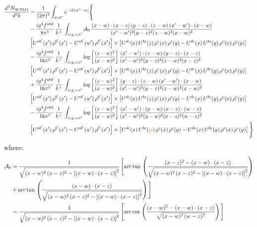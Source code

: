 \documentclass[9pt]{article}
\numberwithin{equation}{section}
\begin{document}
\begin{align}
\frac{d^{3}N_{3b\,\rm NLO}}{d^{3}k} & = \frac{1}{(2\pi)^{3}}\int_{w,w'}e^{-ik(w'-w)}\Bigg\{\notag \\
&-\frac{ig^{4}f^{abd}}{8\pi^{5}}\,\frac{1}{k^{+}}\,\int_{x,y,z,x'}\mathcal{A}_{0}\,
\frac{(x-w)\cdot(x-z)\,(y-z)\cdot(z-w)\,(x'-w')\cdot(x-w)}{(x'-w')^{2}(y-z)^{2}(z-w)^{2}(x-w)^{2}}\notag \\ & \left[U^{ab'}(x')\,\rho^{b'}(x')-U^{ab'}(w')\, \rho^{b'}(x')\right]\times \left[U^{de}(x)\,U^{bc}(z)\, \rho^{e}(x)\,\rho^{c}(y)-U^{de}(x)\,U^{bc}(y)\,\rho^{e}(x)\,\rho^{c}(y)\right] \notag \\
& -\frac{ig^{4}f^{abd}}{16\pi^{5}}\,\frac{1}{k^{+}}\,\int_{x,y,z,x'}\log{\left[\frac{(z-w)^{2}}{(x-w)^{2}}\right]}\,
\frac{(x'-w')\cdot(z-w)\,(y-z)\cdot(x-z)}{(x'-w')^{2}(y-z)^{2}(z-w)^{2}(x-z)^{2}}\notag \\
&\left[U^{ab'}(x')\,\rho^{b'}(x')-U^{ab'}(w')\, \rho^{b'}(x')\right]\times \left[U^{de}(x)\,U^{bc}(z)\, \rho^{e}(x)\,\rho^{c}(y)-U^{de}(x)\,U^{bc}(y)\,\rho^{e}(x)\,\rho^{c}(y)\right] \notag \\
&+ \frac{ig^{4}f^{abd}}{16\pi^{5}}\,\frac{1}{k^{+}}\,\int_{x,y,z,x'}\log{\left[\frac{(z-w)^{2}}{(x-w)^{2}}\right]}\,
\frac{(y-z)\cdot(z-w)\,(x'-w')\cdot(x-w)}{(x'-w')^{2}(y-z)^{2}(z-w)^{2}(x-w)^{2}}\notag \\ 
& \left[U^{ab'}(x')\,\rho^{b'}(x')-U^{ab'}(w')\, \rho^{b'}(x')\right]\times \left[U^{de}(x)\,U^{bc}(z)\, \rho^{e}(x)\,\rho^{c}(y)-U^{de}(x)\,U^{bc}(y)\,\rho^{e}(x)\,\rho^{c}(y)\right]\notag \\ & -\frac{ig^{4}f^{abd}}{16\pi^{5}}\,\frac{1}{k^{+}}\,\int_{x,y,z,x'}\log{\left[\frac{(z-w)^{2}}{(x-w)^{2}}\right]}\,\frac{(x'-w')\cdot(y-w)\, (x-z)\cdot (w-z)}{(x'-w')^{2}(y-w)^{2}(x-z)^{2}(w-z)^{2}}\notag \\ & \left[U^{ab'}(x')\,\rho^{b'}(x')-U^{ab'}(w')\, \rho^{b'}(x')\right]\times \left[U^{de}(x)\,U^{bc}(\textcolor{orange}{w})\, \rho^{e}(x)\,\rho^{c}(y)-U^{de}(x)\,U^{bc}(y)\,\rho^{e}(x)\,\rho^{c}(y)\right]\Bigg\}
\end{align}
where: \begin{align}
\mathcal{A}_{0} & = \frac{1}{\sqrt{(x-w)^{2}\,(x-z)^{2}-\left[(x-w)\cdot (x-z)\right]^{2}}}\, \Bigg[\mathrm{arc\,tan}\,\left(\frac{(x-z)^{2}-(x-w)\cdot (x-z)}{\sqrt{(x-w)^{2}\,(x-z)^{2}-\left[(x-w)\cdot (x-z)\right]^{2}}}\right)\notag \\ & + \mathrm{arc\,tan}\,\left(\frac{(x-w)\cdot (x-z)}{\sqrt{(x-w)^{2}\,(x-z)^{2}-\left[(x-w)\cdot (x-z)\right]^{2}}}\right) \Bigg]\notag \\ & = \frac{1}{\sqrt{(x-w)^{2}\,(x-z)^{2}-\left[(x-w)\cdot (x-z)\right]^{2}}}\, \Bigg[\mathrm{arc\,cos}\,\left(\frac{(x-w)^{2}-(x-w)\cdot (x-z)}{\sqrt{(x-w)^{2}\,(w-z)^{2}}}\right)\Bigg]
\end{align}
\end{document}
